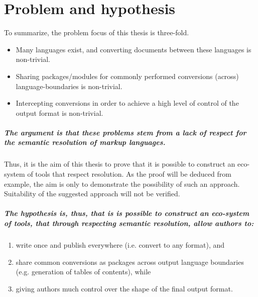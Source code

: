 \documentclass{scrreprt}
\begin{document}
\color{black}
















\chapter{Problem and hypothesis}
To summarize, the problem focus of this thesis is three-fold.

\begin{itemize}
\item Many languages exist, and converting documents between these languages is non-trivial.
\item Sharing packages/modules for commonly performed conversions (across) language-boundaries is non-trivial.
\item Intercepting conversions in order to achieve a high level of control of the output format is non-trivial.
\end{itemize}




\paragraph{The argument is that these problems stem from a lack of respect for the semantic resolution of markup languages.} Thus, it is the aim of this thesis to prove that it is possible to construct an eco-system of tools that respect resolution. As the proof will be deduced from example, the aim is only to demonstrate the possibility of such an approach. Suitability of the suggested approach will not be verified.

\paragraph{The hypothesis is, thus, that is is possible to construct an eco-system of tools, that through respecting semantic resolution, allow authors to:}

\begin{enumerate}
\item write once and publish everywhere (i.e. convert to any format), and
\item share common conversions as packages across output language boundaries (e.g. generation of tables of contents), while
\item giving authors much control over the shape of the final output format.
\end{enumerate}
\end{document}
